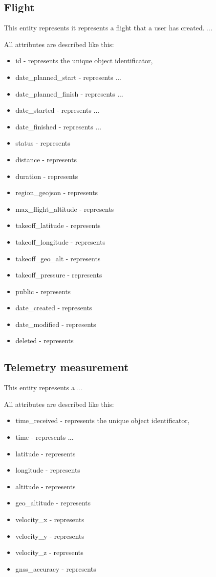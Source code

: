 \subsection{Flight}\label{subsec:flight}
This entity represents it represents a flight that a user has created.
...

All attributes are described like this:
\begin{itemize}
    \item id - represents the unique object identificator,
    \item date\_planned\_start - represents ...
    \item date\_planned\_finish - represents ...
    \item date\_started - represents ...
    \item date\_finished - represents ...
    \item status - represents
    \item distance - represents
    \item duration - represents
    \item region\_geojson - represents
    \item max\_flight\_altitude - represents
    \item takeoff\_latitude - represents
    \item takeoff\_longitude - represents
    \item takeoff\_geo\_alt - represents
    \item takeoff\_pressure - represents
    \item public - represents
    \item date\_created - represents
    \item date\_modified - represents
    \item deleted - represents
\end{itemize}

\subsection{Telemetry measurement}\label{subsec:telemetry-measurement}
This entity represents a ...

All attributes are described like this:
\begin{itemize}
    \item time\_received - represents the unique object identificator,
    \item time - represents ...
    \item latitude - represents
    \item longitude - represents
    \item altitude - represents
    \item geo\_altitude - represents
    \item velocity\_x - represents
    \item velocity\_y - represents
    \item velocity\_z - represents
    \item gnss\_accuracy - represents
\end{itemize}

